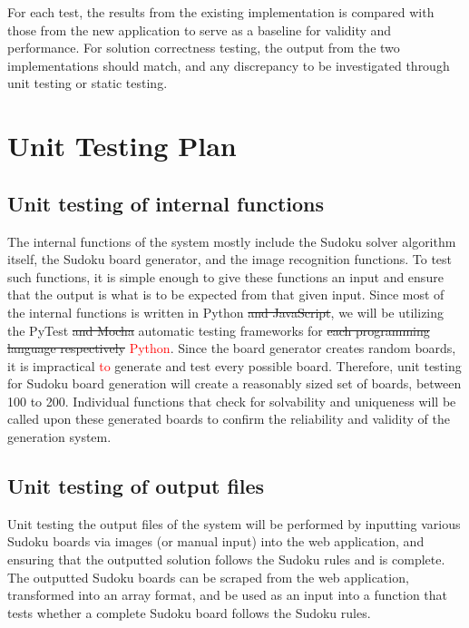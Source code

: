 \documentclass[11pt]{article}
\begin{document}
For each test, the results from the existing implementation is compared with those from the new application to serve as a baseline for validity and performance. For solution correctness testing, the output from the two implementations should match, and any discrepancy to be investigated through unit testing or static testing.
				
\section{Unit Testing Plan}
		
\subsection{Unit testing of internal functions}
The internal functions of the system mostly include the Sudoku solver algorithm itself, the Sudoku board generator, and the image recognition functions. To test such functions, it is simple enough to give these functions an input and ensure that the output is what is to be expected from that given input. Since most of the internal functions is written in Python \sout{and JavaScript}, we will be utilizing the PyTest \sout{and Mocha} automatic testing frameworks for \sout{each programming language respectively} \textcolor{red}{Python}. Since the board generator creates random boards, it is impractical \textcolor{red}{to} generate and test every possible board. Therefore, unit testing for Sudoku board generation will create a reasonably sized set of boards, between 100 to 200. Individual functions that check for solvability and uniqueness will be called upon these generated boards to confirm the reliability and validity of the generation system. 
		
\subsection{Unit testing of output files}		
Unit testing the output files of the system will be performed by inputting various Sudoku boards via images (or manual input) into the web application, and ensuring that the outputted solution follows the Sudoku rules and is complete. The outputted Sudoku boards can be scraped from the web application, transformed into an array format, and be used as an input into a function that tests whether a complete Sudoku board follows the Sudoku rules. 




\end{document}
